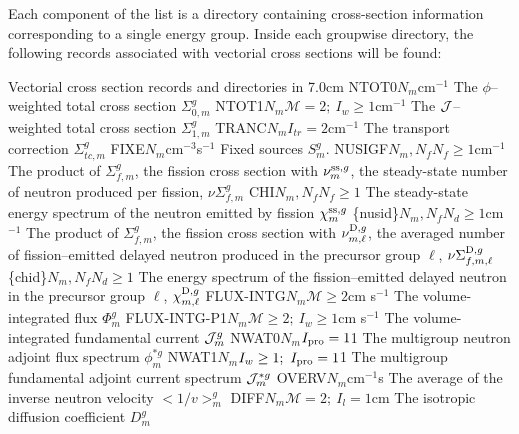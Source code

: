 Each component of the list  is a directory containing cross-section information
corresponding to a single energy group. Inside each groupwise directory, the following
records associated with vectorial cross sections will be found:

\begin{DescriptionEnregistrement}{Vectorial cross section records and directories in
}{7.0cm}
\label{tabl:tabnonlegendre}
\RealEnr
  {NTOT0}{$N_{m}$}{cm$^{-1}$}
  {The $\phi$--weighted total cross section $\Sigma_{0,m}^{g}$}
\OptRealEnr
  {NTOT1}{$N_{m}$}{$\mathcal{M}=2; \ I_{w}\ge 1$}{cm$^{-1}$}
  {The ${\cal J}$--weighted total cross section $\Sigma_{1,m}^{g}$}
\OptRealEnr
  {TRANC}{$N_{m}$}{$I_{tr}=2$}{cm$^{-1}$} 
  {The transport correction $\Sigma_{tc,m}^{g}$}
\RealEnr
  {FIXE}{$N_{m}$}{cm$^{-3}$s$^{-1}$}
  {Fixed sources $S_{m}^{g}$.}
\OptRealEnr
  {NUSIGF}{$N_{m},N_{f}$}{$N_{f}\ge 1$}{cm$^{-1}$} 
  {The product of $\Sigma_{f,m}^{g}$, the fission cross section with
   $\nu_{m}^{{\rm ss},g}$, the steady-state number of neutron produced per fission,
   $\nu\Sigma_{f,m}^{g}$}
\OptRealEnr
  {CHI}{$N_{m},N_{f}$}{$N_{f}\ge 1$}{}
  {The steady-state energy spectrum of the neutron emitted by fission $\chi_{m}^{{\rm ss},g}$}
\OptRealVar
  {\{nusid\}}{$N_{m},N_{f}$}{$N_{d}\ge 1$}{cm$^{-1}$} 
  {The product of $\Sigma_{f,m}^{g}$, the fission cross section with
   $\nu_{m,\ell}^{{\rm D},g}$, the averaged number of fission--emitted delayed
   neutron produced in the precursor group $\ell$,
   $\nu\Sigma_{f,m,\ell}^{{\rm D},g}$}
\OptRealVar
  {\{chid\}}{$N_{m},N_{f}$}{$N_{d}\ge 1$}{}
  {The energy spectrum of the fission--emitted delayed neutron
  in the precursor group $\ell$, $\chi_{m,\ell}^{{\rm D},g}$}
\OptRealEnr
  {FLUX-INTG}{$N_{m}$}{$\mathcal{M}\ge 2$}{cm s$^{-1}$}  
  {The volume-integrated flux $\Phi_{m}^{g}$}
\OptRealEnr
  {FLUX-INTG-P1}{$N_{m}$}{$\mathcal{M}\ge 2; \ I_{w}\ge 1$}{cm s$^{-1}$}  
  {The volume-integrated fundamental current ${\cal J}_{m}^{g}$}
\OptRealEnr
  {NWAT0}{$N_{m}$}{$I_{\rm pro}=1$}{1}
  {The multigroup neutron adjoint flux spectrum $\phi_{m}^{*g}$} 
\OptRealEnr
  {NWAT1}{$N_{m}$}{$I_{w}\ge 1; \ I_{\rm pro}=1$}{1}
  {The multigroup fundamental adjoint current spectrum ${\cal J}_{m}^{*g}$} 
\RealEnr
  {OVERV}{$N_{m}$}{cm$^{-1}$s}  
  {The average of the inverse neutron velocity \hbox{$<1/v>_{m}^g$}}
\OptRealEnr
  {DIFF}{$N_{m}$}{$\mathcal{M}=2; \ I_{l}=1$}{cm}  
  {The isotropic diffusion coefficient
   $D_{m}^{g}$}

\end{DescriptionEnregistrement}
